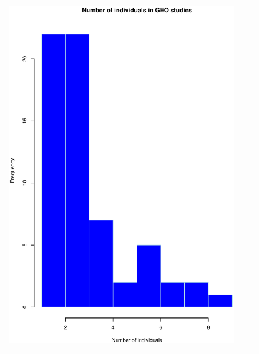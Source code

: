 \begin{figure}[h!]
\begin{tabular}{ccc}
\includegraphics[scale=0.24]{GEOind.eps} &

\end{tabular}
\end{figure}
